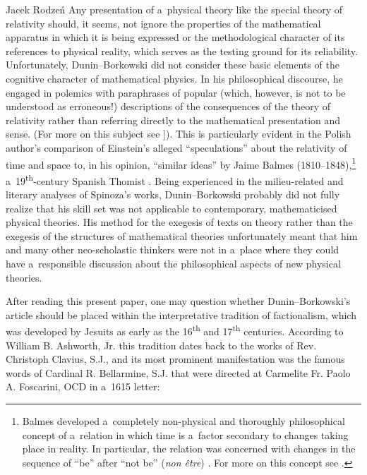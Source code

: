 \begin{artengenv}{Jacek Rodzeń}
Any presentation of a~physical theory like the special theory of relativity should, it seems, not ignore the properties of the mathematical apparatus in which it is being expressed or the methodological character of its references to physical reality, which serves as the testing ground for its reliability. Unfortunately, Dunin–Borkowski did not consider these basic elements of the cognitive character of mathematical physics. In his philosophical discourse, he engaged in polemics with paraphrases of popular (which, however, is not to be understood as erroneous!) descriptions of the consequences of the theory of relativity rather than referring directly to the mathematical presentation and sense. (For more on this subject see
\parencite[][pp.101–102]{heller_physics_1999}%
]). This is particularly evident in the Polish author's comparison of Einstein's alleged ``speculations'' about the relativity of time and space to, in his opinion, ``similar ideas'' by Jaime Balmes (1810–1848),\footnote{Balmes developed a~completely non-physical and thoroughly philosophical concept of a~relation in which time is a~factor secondary to changes taking place in reality. In particular, the relation was concerned with changes in the sequence of ``be'' after ``not be'' (\textit{non être}) 
\parencite[cf.][]{balmes_philosophie_1852}. %
 For more on this concept see 
\parencite[][pp.678–683]{wojciechowski_teorie_1955}.%
} a~19\textsuperscript{th}-century Spanish Thomist 
\parencite[][p.275]{dunin-borkowski_auf_1921}. %
 Being experienced in the milieu-related and literary analyses of Spinoza's works, Dunin–Borkowski probably did not fully realize that his skill set was not applicable to contemporary, mathematicised physical theories. His method for the exegesis of texts on theory rather than the exegesis of the structures of mathematical theories unfortunately meant that him and many other neo-scholastic thinkers were not in a~place where they could have a~responsible discussion about the philosophical aspects of new physical theories.

After reading this present paper, one may question whether Dunin–Borkowski's article should be placed within the interpretative tradition of factionalism, which was developed by Jesuits as early as the 16\textsuperscript{th} and 17\textsuperscript{th} centuries. According to William B. Ashworth, Jr. this tradition dates back to the works of Rev. Christoph Clavius, S.J., and its most prominent manifestation was the famous words of Cardinal R. Bellarmine, S.J. that were directed at Carmelite Fr. Paolo A. Foscarini, OCD in a~1615 letter:


\end{artengenv}
